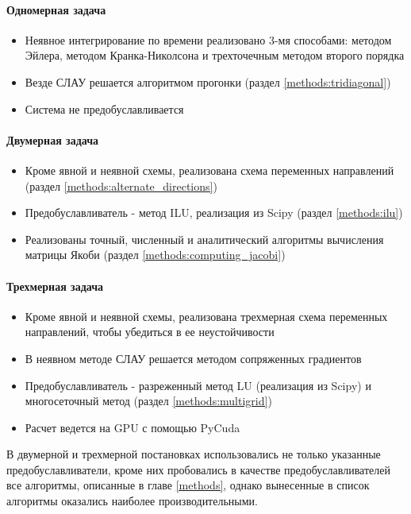 \paragraph{Одномерная задача}
\begin{itemize}
\item Неявное интегрирование по времени реализовано 3-мя способами: методом Эйлера, методом Кранка-Николсона и трехточечным методом второго порядка
\item Везде СЛАУ решается алгоритмом прогонки (раздел  \ref{methods:tridiagonal})
\item Система не предобуславливается
\end{itemize}

\paragraph{Двумерная задача}
\begin{itemize}
\item Кроме явной и неявной схемы, реализована схема переменных направлений (раздел \ref{methods:alternate_directions})
\item Предобуславливатель - метод ILU, реализация из Scipy (раздел \ref{methods:ilu})
\item Реализованы точный, численный и аналитический алгоритмы вычисления матрицы Якоби (раздел \ref{methods:computing_jacobi})
\end{itemize}

\paragraph{Трехмерная задача}
\begin{itemize}
\item Кроме явной и неявной схемы, реализована трехмерная схема переменных направлений, чтобы убедиться в ее неустойчивости
\item В неявном методе СЛАУ решается методом сопряженных градиентов
\item Предобуславливатель - разреженный метод LU (реализация из Scipy) и многосеточный метод (раздел \ref{methods:multigrid})
\item Расчет ведется на GPU с помощью PyCuda 
\end{itemize}
В двумерной и трехмерной постановках использовались не только указанные предобуславливатели, кроме них пробовались в качестве предобуславливателей все алгоритмы, описанные в главе \ref{methods}, однако вынесенные в список алгоритмы оказались наиболее производительными.

